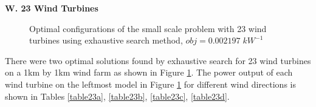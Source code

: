     \textbf{W. 23 Wind Turbines}
        \begin{figure}[H]
            \centering
            \qquad
            \caption{Optimal configurations of the small scale problem with 23 wind turbines using exhaustive search method, $obj=0.002197\;kW^{-1}$}
            \label{small23}
        \end{figure}
        
        There were two optimal solutions found by exhaustive search for 23 wind turbines on a 1km by 1km wind farm as shown in Figure \ref{small23}. The power output of each wind turbine on the leftmost model in Figure \ref{small23} for different wind directions is shown in Tables \ref{table23a}, \ref{table23b}, \ref{table23c}, \ref{table23d}.
        
